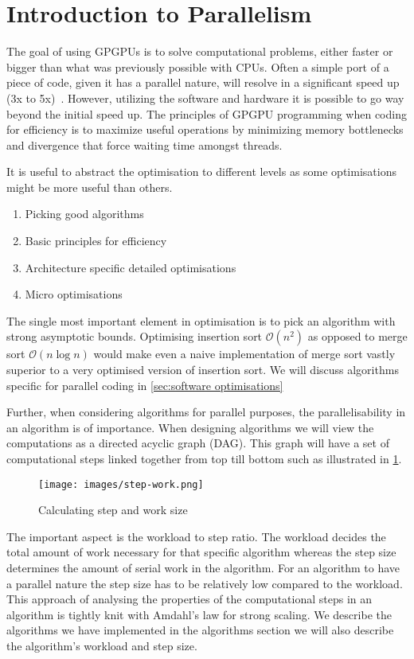 \section{Introduction to Parallelism}
\label{sec:introduction to parallelism}
The goal of using GPGPUs is to solve computational problems, either faster or bigger than what was previously possible with CPUs.
Often a simple port of a piece of code, given it has a parallel nature, will resolve in a significant speed up (3x to 5x)~\cite{udacity}.
However, utilizing the software and hardware it is possible to go way beyond the initial speed up.
The principles of GPGPU programming when coding for efficiency is to maximize useful operations by minimizing memory bottlenecks and divergence that force waiting time amongst threads.

It is useful to abstract the optimisation to different levels as some optimisations might be more useful than others.

\begin{enumerate}
\item Picking good algorithms
\item Basic principles for efficiency
\item Architecture specific detailed optimisations
\item Micro optimisations
\end{enumerate}

The single most important element in optimisation is to pick an algorithm with strong asymptotic bounds.
Optimising insertion sort $\mathcal{O}(n^2)$ as opposed to merge sort $\mathcal{O}(n\log n)$ would make even a naive implementation of merge sort vastly superior to a very optimised version of insertion sort.
We will discuss algorithms specific for parallel coding in \cref{sec:software optimisations}

Further, when considering algorithms for parallel purposes, the parallelisability in an algorithm is of importance.
When designing algorithms we will view the computations as a directed acyclic graph (DAG).
This graph will have a set of computational steps linked together from top till bottom such as illustrated in \cref{fig:step and work}.

\begin{figure}[htb]
  \centering
  \texttt{[image: images/step-work.png]}
  \caption{Calculating step and work size~\cite{udacity}}
  \label{fig:step and work}
\end{figure}

The important aspect is the workload to step ratio. The workload decides the total amount of work necessary for that specific algorithm whereas the step size determines the amount of serial work in the algorithm.
For an algorithm to have a parallel nature the step size has to be relatively low compared to the workload.
This approach of analysing the properties of the computational steps in an algorithm is tightly knit with Amdahl's law for strong scaling.
We describe the algorithms we have implemented in the algorithms section we will also describe the algorithm's workload and step size.

